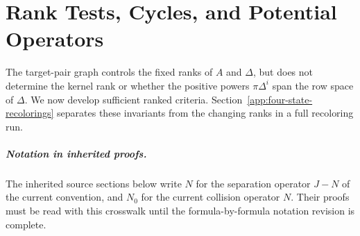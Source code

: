 \chapter{Rank Tests, Cycles, and Potential Operators}
\label{organized:potential}
The target-pair graph controls the fixed ranks of $A$ and $\Delta$,
but does not determine the kernel rank or whether the positive powers
$\pi\Delta^i$ span the row space of $\Delta$. We now develop sufficient
ranked criteria. Section~\ref{app:four-state-recolorings} separates these
invariants from the changing ranks in a full recoloring run.
\paragraph{Notation in inherited proofs.}
The inherited source sections below write $N$ for the separation operator
$J-N$ of the current convention, and $N_0$ for the current collision
operator $N$. Their proofs must be read with this crosswalk until the
formula-by-formula notation revision is complete.





